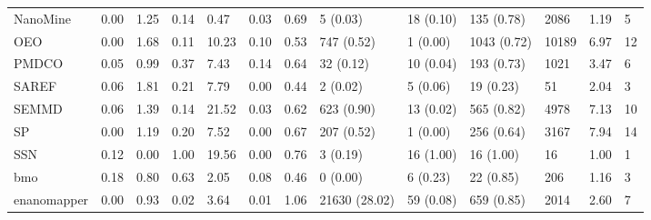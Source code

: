 \begin{table}
\begin{tabular}{m{3.5cm}m{2cm}m{2cm}m{2cm}m{2cm}m{2cm}m{2cm}m{2cm}m{2cm}m{2cm}m{2cm}m{2cm}m{2cm}}
NanoMine                &                0.00 &                  1.25 &                   0.14 &               0.47 &               0.03 &                  0.69 &       5 (0.03) &   18 (0.10) &   135 (0.78) &            2086 &     1.19 &          5 \\
OEO                     &                0.00 &                  1.68 &                   0.11 &              10.23 &               0.10 &                  0.53 &     747 (0.52) &    1 (0.00) &  1043 (0.72) &           10189 &     6.97 &         12 \\
PMDCO                   &                0.05 &                  0.99 &                   0.37 &               7.43 &               0.14 &                  0.64 &      32 (0.12) &   10 (0.04) &   193 (0.73) &            1021 &     3.47 &          6 \\
SAREF                   &                0.06 &                  1.81 &                   0.21 &               7.79 &               0.00 &                  0.44 &       2 (0.02) &    5 (0.06) &    19 (0.23) &              51 &     2.04 &          3 \\
SEMMD                   &                0.06 &                  1.39 &                   0.14 &              21.52 &               0.03 &                  0.62 &     623 (0.90) &   13 (0.02) &   565 (0.82) &            4978 &     7.13 &         10 \\
SP                      &                0.00 &                  1.19 &                   0.20 &               7.52 &               0.00 &                  0.67 &     207 (0.52) &    1 (0.00) &   256 (0.64) &            3167 &     7.94 &         14 \\
SSN                     &                0.12 &                  0.00 &                   1.00 &              19.56 &               0.00 &                  0.76 &       3 (0.19) &   16 (1.00) &    16 (1.00) &              16 &     1.00 &          1 \\
bmo                     &                0.18 &                  0.80 &                   0.63 &               2.05 &               0.08 &                  0.46 &       0 (0.00) &    6 (0.23) &    22 (0.85) &             206 &     1.16 &          3 \\
enanomapper             &                0.00 &                  0.93 &                   0.02 &               3.64 &               0.01 &                  1.06 &  21630 (28.02) &   59 (0.08) &   659 (0.85) &            2014 &     2.60 &          7 \\

\end{tabular}
\end{table}
